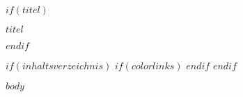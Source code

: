\documentclass{\VorlagenPfad/coderdojokatext}
\begin{document}
$if(titel)$
\begin{center}
	{\huge $titel$}
\end{center}
$endif$

$if(inhaltsverzeichnis)$
{
$if(colorlinks)$
\hypersetup{linkcolor=$if(toccolor)$$toccolor$$else$black$endif$}
$endif$
\setcounter{tocdepth}{$toc-depth$}
\tableofcontents
\pagebreak
}
$endif$




$body$
\end{document}
